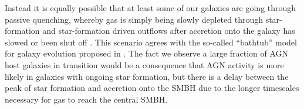 \documentclass[fleqn, usenatbib]{mnras}
\newcommand{\herschel}{\emph{Herschel}}
\begin{document}
Instead it is equally possible that at least some of our galaxies are going through passive quenching, whereby gas is simply being slowly depleted through star-formation and star-formation driven outflows after accretion onto the galaxy has slowed or been shut off \citep{Peng:2015yg}. This scenario agrees with the so-called ``bathtub'' model for galaxy evolution proposed in \citet{Lilly:2013pd}. The fact we observe a large fraction of AGN host galaxies in transition would be a consequence that AGN activity is more likely in galaxies with ongoing star formation, but there is a delay between the peak of star formation and accretion onto the SMBH \citep{Davies:2007kx, Sani:2012vn, Schawinski:2014cr} due to the longer timescales necessary for gas to reach the central SMBH. 

 
\end{document}
